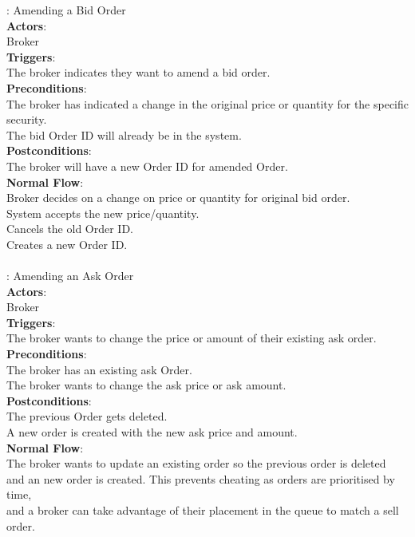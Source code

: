 \documentclass[a4paper]{article}
\begin{document}
: Amending a Bid Order \\ 
{\bf Actors}:\\
\indent Broker \\
{\bf Triggers}: \\
\indent The broker indicates they want to amend a bid order. \\
{\bf Preconditions}: \\
\indent The broker has indicated a change in the original price or quantity for the specific \\
security.\\
\indent The bid Order ID will already be in the system. \\
{\bf Postconditions}: \\
\indent The broker will have a new Order ID for amended Order. \\
{\bf Normal Flow}: \\
\indent Broker decides on a change on price or quantity for original bid order. \\
\indent System accepts the new price/quantity. \\
\indent Cancels the old Order ID. \\
\indent Creates a new Order ID. \\ \\

: Amending an Ask Order \\ 
{\bf Actors}:\\
\indent Broker \\
{\bf Triggers}: \\
\indent The broker wants to change the price or amount of their existing ask order. \\
{\bf Preconditions}: \\
\indent The broker has an existing ask Order.\\
\indent The broker wants to change the ask price or ask amount. \\
{\bf Postconditions}: \\
\indent The previous Order gets deleted. \\
\indent A new order is created with the new ask price and amount. \\
{\bf Normal Flow}: \\
\indent The broker wants to update an existing order so the previous order is deleted \\
and an new order is created. This prevents cheating as orders are prioritised by time, \\
and a broker can take advantage of their placement in the queue to match a sell order. \\ \\
\end{document}
